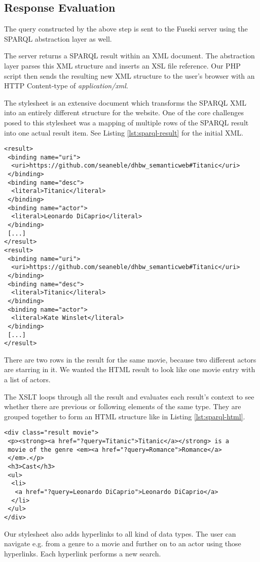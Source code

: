 \subsection{Response Evaluation}
The query constructed by the above step is sent to the Fuseki server using the SPARQL abstraction layer as well.

The server returns a SPARQL result within an XML document. The abstraction layer parses this XML structure and inserts an XSL file reference. Our PHP script then sends the resulting new XML structure to the user's browser with an HTTP Content-type of \textit{application/xml}.

The stylesheet is an extensive document which transforms the SPARQL XML into an entirely different structure for the website. One of the core challenges posed to this stylesheet was a mapping of multiple rows of the SPARQL result into one actual result item. See Listing \ref{lst:sparql-result} for the initial XML.

\begin{lstlisting}[caption={XML extract returned by the server when searching for a movie},label={lst:sparql-result}]
<result>
 <binding name="uri">
  <uri>https://github.com/seaneble/dhbw_semanticweb#Titanic</uri>
 </binding>
 <binding name="desc">
  <literal>Titanic</literal>
 </binding>
 <binding name="actor">
  <literal>Leonardo DiCaprio</literal>
 </binding>
 [...]
</result>
<result>
 <binding name="uri">
  <uri>https://github.com/seaneble/dhbw_semanticweb#Titanic</uri>
 </binding>
 <binding name="desc">
  <literal>Titanic</literal>
 </binding>
 <binding name="actor">
  <literal>Kate Winslet</literal>
 </binding>
 [...]
</result>
\end{lstlisting}

There are two rows in the result for the same movie, because two different actors are starring in it. We wanted the HTML result to look like one movie entry with a list of actors.

The XSLT loops through all the result and evaluates each result's context to see whether there are previous or following elements of the same type. They are grouped together to form an HTML structure like in Listing \ref{lst:sparql-html}.

\begin{lstlisting}[caption={HTML structure for one movie result},label={lst:sparql-html}]
<div class="result movie">
 <p><strong><a href="?query=Titanic">Titanic</a></strong> is a
 movie of the genre <em><a href="?query=Romance">Romance</a>
 </em>.</p>
 <h3>Cast</h3>
 <ul>
  <li>
   <a href="?query=Leonardo DiCaprio">Leonardo DiCaprio</a>
  </li>
 </ul>
</div>
\end{lstlisting}

Our stylesheet also adds hyperlinks to all kind of data types. The user can navigate e.g. from a genre to a movie and further on to an actor using those hyperlinks. Each hyperlink performs a new search.